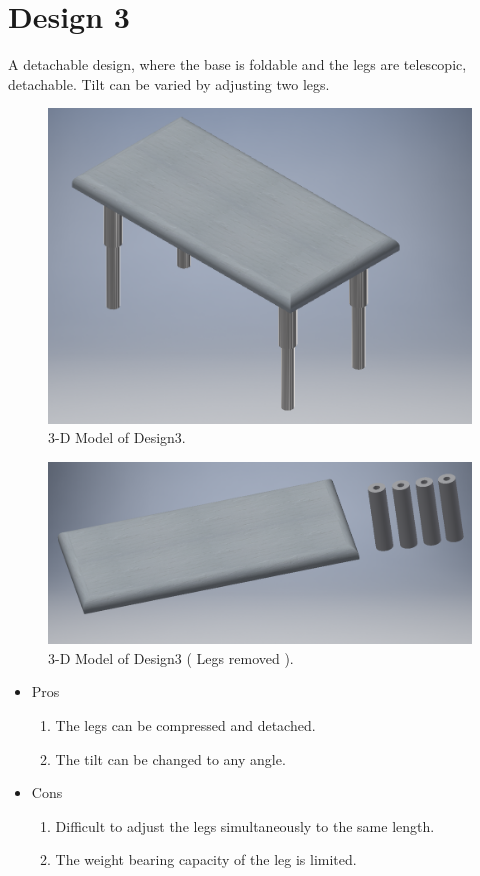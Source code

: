 \section{Design 3}

A detachable design, where the base is foldable and the legs are telescopic, detachable. Tilt can be varied by adjusting two legs\cite{adj_kbtray}.

\begin{figure}
  \includegraphics[width=\linewidth]{design3_1}
  \caption{3-D Model of Design3.}
  \label{fig:Design1}
\end{figure}

\begin{figure}
  \includegraphics[width=\linewidth]{design3_2}
  \caption{3-D Model of Design3 ( Legs removed ).}
  \label{fig:Design1}
\end{figure}

\begin{itemize}
 \item Pros
 \begin{enumerate}
	\item The legs can be compressed and detached.
    \item The tilt can be changed to any angle.
 \end{enumerate}
 \item Cons
 \begin{enumerate}
	\item Difficult to adjust the legs simultaneously to the same length.
    \item The weight bearing capacity of the leg is limited.
 \end{enumerate}
\end{itemize}

